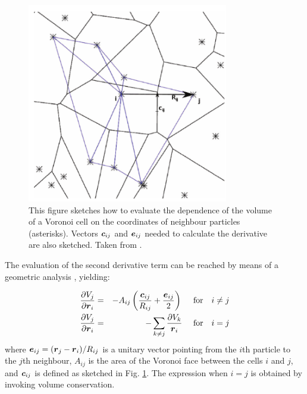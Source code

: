 \documentclass[a4,useAMS,usenatbib,usegraphicx,12pt]{article}
\begin{document}
\begin{figure}[h]
\centering

  \includegraphics[trim = 0mm 0mm 0mm 0mm, clip, keepaspectratio=true,
  width=0.35\textheight]{./figures/VoronoiVolume.png}
  
  \caption{\small This figure sketches how to evaluate the dependence of the 
  volume of a Voronoi cell on the coordinates of neighbour particles 
  (asterisks). Vectors $\boldsymbol{ c }_{ij}$ and $\boldsymbol{ e }_{ij}$ needed to calculate 
  the derivative are also sketched. Taken from \citet{Hess10}. }

  \label{fig:VoronoiVolume}

\end{figure}

The evaluation of the second derivative term can be reached by means of a 
geometric analysis \citep{Serrano01}, yielding:

\begin{eqnarray}
\nonumber{}
\frac{\partial V_j}{\partial \boldsymbol{ r }_i} &=& -A_{ij}\left(  \frac{\boldsymbol{ c }_{ij}}{R_{ij}}
+ \frac{\boldsymbol{ e }_{ij}}{2}  \right) \ \ \ \ \mbox{for}\ \ \ i\neq j \\
\label{VoronoiVolume}
\frac{\partial V_j}{\partial \boldsymbol{ r }_i} &=& -\sum_{k\neq j}\frac{\partial V_k}{\boldsymbol{ r }_i} \ \ \ \ \mbox{for}\ \ \ i=j
\end{eqnarray}
where $\boldsymbol{ e }_{ij} = (\boldsymbol{ r }_j - \boldsymbol{ r }_i )/R_{ij}$ is a unitary vector 
pointing from the $i$th particle to the $j$th neighbour, $A_{ij}$ is the area 
of the Voronoi face between the cells $i$ and $j$, and $\boldsymbol{ c }_{ij}$ is defined
as sketched in Fig. \ref{fig:VoronoiVolume}. The expression when $i=j$ is 
obtained by invoking volume conservation.
\end{document}
